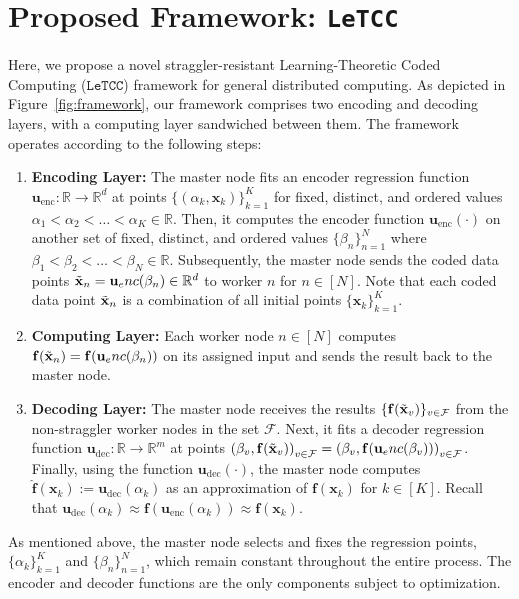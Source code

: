 \documentclass{article}
\def\enc{\mathbf{u}_\textrm{enc}}
\def\dec{\mathbf{u}_\textrm{dec}}
\def\nprcc{\texttt{LeTCC}}
\def\func{\mathbf{f}}
\def\stset{\mathcal{F}}
\begin{document}
\section{Proposed Framework: \nprcc}\label{sec:framework}
Here, we propose a novel straggler-resistant Learning-Theoretic Coded Computing ($\nprcc$) framework for general distributed computing. As depicted in Figure~\ref{fig:framework}, our framework comprises two encoding and decoding layers, with a computing layer sandwiched between them. The framework operates according to the following steps:
\begin{enumerate}[label={(\arabic*)}]
\setlength\itemsep{0.1em}
    \item \textbf{Encoding Layer:} The master node fits an encoder regression function $\enc: \mathbb{R} \to \mathbb{R}^d$ at points $\{(\alpha_k, \mathbf{x}_k)\}^K_{k=1}$ for fixed, distinct, and ordered values $\alpha_1 < \alpha_2 < \dots < \alpha_{K} \in \mathbb{R}$. Then, it computes the encoder function $\enc(\cdot)$ on another set of fixed, distinct, and ordered values $\{\beta_n\}_{n=1}^N$ where $\beta_1 < \beta_2 < \dots < \beta_{N} \in \mathbb{R}$. Subsequently, the master node sends the coded data points $\Tilde{\mathbf{x}}_n = \enc(\beta_n) \in \mathbb{R}^d$ to worker $n$ for $n \in [N]$. Note that each coded data point $\Tilde{\mathbf{x}}_n$ is a combination of all initial points $\{\mathbf{x}_k\}^K_{k=1}$.
    \item \textbf{Computing Layer:} Each worker node $n \in [N]$ computes $\func(\Tilde{\mathbf{x}}_n) = \func(\enc(\beta_n))$ on its assigned input and sends the result back to the master node.
    \item \textbf{Decoding Layer:} The master node receives the results $\{\func(\Tilde{\mathbf{x}}_v)\}_{v\in \stset}$ from the non-straggler worker nodes in the set $\stset$. Next, it fits a decoder regression function $\dec: \mathbb{R} \to \mathbb{R}^m$ at points ${(\beta_{v}, \func(\Tilde{\mathbf{x}}_v))}_{v\in \stset}= {(\beta_{v}, \func(\enc(\beta_{v})))}_{v\in \stset}$. Finally, using the function $\dec(\cdot)$, the master node computes $\hat{\func}(\mathbf{x}_k):=\dec(\alpha_k)$ as an approximation of $\func(\mathbf{x}_k)$ for $k \in [K]$. Recall that $\dec(\alpha_k) \approx \func(\enc(\alpha_k)) \approx \func(\mathbf{x}_k)$.
\end{enumerate}

As mentioned above, the master node selects and fixes the regression points, $\{\alpha_k\}^K_{k=1}$ and  $\{\beta_n\}^N_{n=1}$, which remain constant throughout the entire process. The encoder and decoder functions are the only components subject to optimization. 
\end{document}
